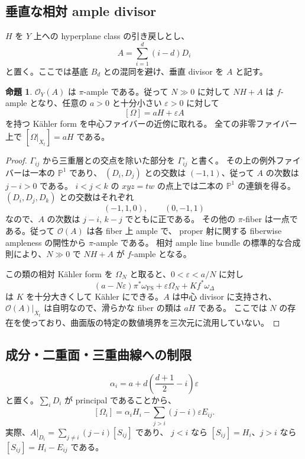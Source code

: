 \documentclass[11pt,a4paper]{article}
\theoremstyle{definition}
\newtheorem{proposition}[theorem]{命題}
\newcommand{\PP}{\mathbb P}
\newcommand{\eps}{\varepsilon}
\begin{document}
\subsection{垂直な相対 ample divisor}

$H$ を $Y$ 上への hyperplane class の引き戻しとし、
\[
A=\sum_{i=1}^d(i-d)D_i
\]
と置く。ここでは基底 $B_d$ との混同を避け、垂直 divisor を $A$ と記す。

\begin{proposition}\label{prop:polarization}
$\mathcal O_Y(A)$ は $\pi$-ample である。従って $N\gg0$ に対して $NH+A$ は
$f$-ample となり、任意の $a>0$ と十分小さい $\eps>0$ に対して
\[
[\Omega]=aH+\eps A
\]
を持つ Kähler form を中心ファイバーの近傍に取れる。
全ての非零ファイバー上で $[\Omega|_{X_t}]=aH$ である。
\end{proposition}

\begin{proof}
$\Gamma_{ij}$ から三重層との交点を除いた部分を $\Gamma_{ij}^{\circ}$ と書く。
その上の例外ファイバーは一本の $\PP^1$ であり、
$(D_i,D_j)$ との交数は $(-1,1)$、従って $A$ の次数は $j-i>0$ である。
$i<j<k$ の $xyz=tw$ の点上では二本の $\PP^1$ の連鎖を得る。
$(D_i,D_j,D_k)$ との交数はそれぞれ
\[
(-1,1,0),\qquad (0,-1,1)
\]
なので、$A$ の次数は $j-i$, $k-j$ でともに正である。
その他の $\pi$-fiber は一点である。従って $\mathcal O(A)$ は各 fiber 上 ample で、
proper 射に関する fiberwise ampleness の開性から $\pi$-ample である\cite{stacks}。
相対 ample line bundle の標準的な合成則により、$N\gg0$ で $NH+A$ が $f$-ample となる。

この類の相対 Kähler form を $\Omega_N$ と取ると、$0<\eps<a/N$ に対し
\[
(a-N\eps)\pi^*\omega_{\mathrm{FS}}+\eps\Omega_N+Kf^*\omega_\Delta
\]
は $K$ を十分大きくして Kähler にできる。$A$ は中心 divisor に支持され、
$\mathcal O(A)|_{X_t}$ は自明なので、滑らかな fiber の類は $aH$ である。
ここでは $N$ の存在を使っており、曲面版の特定の数値境界を三次元に流用していない。
\end{proof}

\subsection{成分・二重面・三重曲線への制限}

\[
\alpha_i=a+d\left(\frac{d+1}{2}-i\right)\eps
\]
と置く。$\sum_iD_i$ が principal であることから、
\begin{equation}\label{eq:component-class}
[\Omega_i]=\alpha_iH_i-\sum_{j>i}(j-i)\eps E_{ij}.
\end{equation}
実際、$A|_{D_i}=\sum_{j\ne i}(j-i)[S_{ij}]$ であり、
$j<i$ なら $[S_{ij}]=H_i$、$j>i$ なら $[S_{ij}]=H_i-E_{ij}$ である。
\end{document}
